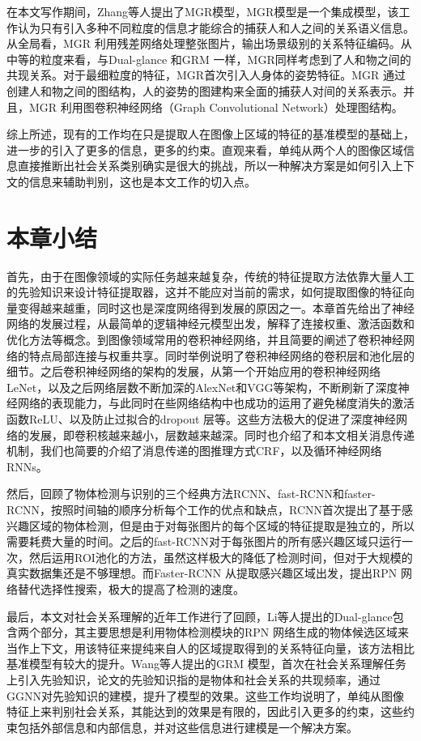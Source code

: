 在本文写作期间，Zhang等人\cite{zhang2019multi}提出了MGR模型，MGR模型是一个集成模型，该工作认为只有引入多种不同粒度的信息才能综合的捕获人和人之间的关系语义信息。从全局看，MGR 利用残差网络处理整张图片，输出场景级别的关系特征编码。从中等的粒度来看，与Dual-glance 和GRM 一样，MGR同样考虑到了人和物之间的共现关系。对于最细粒度的特征，MGR首次引入人身体的姿势特征。MGR 通过创建人和物之间的图结构，人的姿势的图建构来全面的捕获人对间的关系表示。并且，MGR 利用图卷积神经网络（Graph Convolutional Network）\cite{kipf2016semi}处理图结构。


综上所述，现有的工作均在只是提取人在图像上区域的特征的基准模型的基础上，进一步的引入了更多的信息，更多的约束。直观来看，单纯从两个人的图像区域信息直接推断出社会关系类别确实是很大的挑战，所以一种解决方案是如何引入上下文的信息来辅助判别，这也是本文工作的切入点。

\section{本章小结}

首先，由于在图像领域的实际任务越来越复杂，传统的特征提取方法依靠大量人工的先验知识来设计特征提取器，这并不能应对当前的需求，如何提取图像的特征向量变得越来越重，同时这也是深度网络得到发展的原因之一。本章首先给出了神经网络的发展过程，从最简单的逻辑神经元模型出发，解释了连接权重、激活函数和优化方法等概念。到图像领域常用的卷积神经网络，并且简要的阐述了卷积神经网络的特点局部连接与权重共享。同时举例说明了卷积神经网络的卷积层和池化层的细节。之后卷积神经网络的架构的发展，从第一个开始应用的卷积神经网络LeNet，以及之后网络层数不断加深的AlexNet和VGG等架构，不断刷新了深度神经网络的表现能力，与此同时在些网络结构中也成功的运用了避免梯度消失的激活函数ReLU、以及防止过拟合的dropout 层等。这些方法极大的促进了深度神经网络的发展，即卷积核越来越小，层数越来越深。同时也介绍了和本文相关消息传递机制，我们也简要的介绍了消息传递的图推理方式CRF，以及循环神经网络RNNs。

然后，回顾了物体检测与识别的三个经典方法RCNN、fast-RCNN和faster-RCNN，按照时间轴的顺序分析每个工作的优点和缺点，RCNN首次提出了基于感兴趣区域的物体检测，但是由于对每张图片的每个区域的特征提取是独立的，所以需要耗费大量的时间。之后的fast-RCNN对于每张图片的所有感兴趣区域只运行一次，然后运用ROI池化的方法，虽然这样极大的降低了检测时间，但对于大规模的真实数据集还是不够理想。而Faster-RCNN 从提取感兴趣区域出发，提出RPN 网络替代选择性搜索，极大的提高了检测的速度。

最后，本文对社会关系理解的近年工作进行了回顾，Li等人提出的Dual-glance包含两个部分，其主要思想是利用物体检测模块的RPN 网络生成的物体候选区域来当作上下文，用该特征来提纯来自人的区域提取得到的关系特征向量，该方法相比基准模型有较大的提升。Wang等人提出的GRM 模型，首次在社会关系理解任务上引入先验知识，论文的先验知识指的是物体和社会关系的共现频率，通过GGNN对先验知识的建模，提升了模型的效果。这些工作均说明了，单纯从图像特征上来判别社会关系，其能达到的效果是有限的，因此引入更多的约束，这些约束包括外部信息和内部信息，并对这些信息进行建模是一个解决方案。








